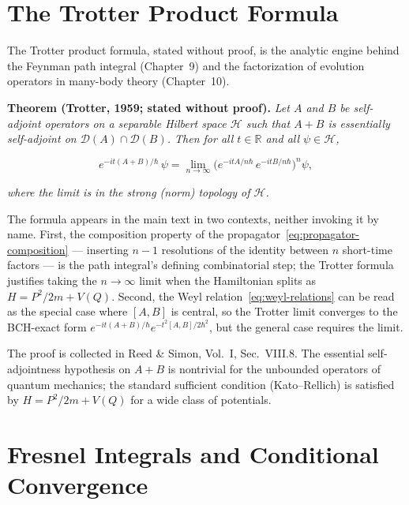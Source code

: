 \section{The Trotter Product Formula}
\label{sec:appendix-trotter}

The Trotter product formula, stated without proof, is the analytic engine behind the Feynman path integral (Chapter~9) and the factorization of evolution operators in many-body theory (Chapter~10).

\medskip\noindent\textbf{Theorem (Trotter, 1959; stated without proof).} \emph{Let $A$ and $B$ be self-adjoint operators on a separable Hilbert space $\mathcal{H}$ such that $A + B$ is essentially self-adjoint on $\mathcal{D}(A) \cap \mathcal{D}(B)$. Then for all $t \in \mathbb{R}$ and all $\psi \in \mathcal{H}$,}
\begin{linenomath}
    \begin{equation}
        e^{-it(A+B)/\hbar}\,\psi = \lim_{n \to \infty} \bigl(e^{-itA/n\hbar}\,e^{-itB/n\hbar}\bigr)^n \psi,
        \label{eq:trotter}
    \end{equation}
\end{linenomath}
\emph{where the limit is in the strong (norm) topology of $\mathcal{H}$.}

The formula appears in the main text in two contexts, neither invoking it by name. First, the composition property of the propagator~\eqref{eq:propagator-composition} --- inserting $n-1$ resolutions of the identity between $n$ short-time factors --- is the path integral's defining combinatorial step; the Trotter formula justifies taking the $n \to \infty$ limit when the Hamiltonian splits as $H = P^2/2m + V(Q)$. Second, the Weyl relation~\eqref{eq:weyl-relations} can be read as the special case where $[A,B]$ is central, so the Trotter limit converges to the BCH-exact form $e^{-it(A+B)/\hbar} e^{-t^2[A,B]/2\hbar^2}$, but the general case requires the limit.

The proof is collected in Reed \& Simon, Vol.~I, Sec.~VIII.8. The essential self-adjointness hypothesis on $A + B$ is nontrivial for the unbounded operators of quantum mechanics; the standard sufficient condition (Kato--Rellich) is satisfied by $H = P^2/2m + V(Q)$ for a wide class of potentials.

\section{Fresnel Integrals and Conditional Convergence}
\label{sec:appendix-fresnel}

